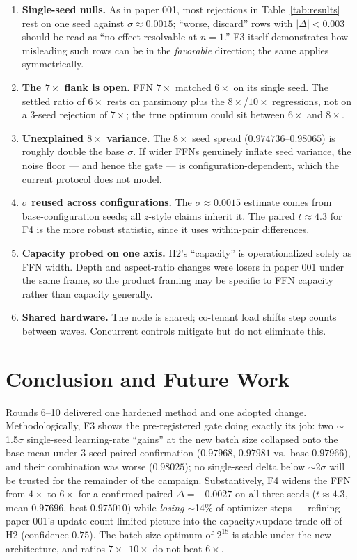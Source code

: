 \documentclass{article}
\begin{document}
\begin{enumerate}
    \item \textbf{Single-seed nulls.} As in paper 001, most rejections in Table~\ref{tab:results} rest on one seed against $\sigma \approx 0.0015$; ``worse, discard'' rows with $|\Delta| < 0.003$ should be read as ``no effect resolvable at $n{=}1$.'' F3 itself demonstrates how misleading such rows can be in the \emph{favorable} direction; the same applies symmetrically.
    \item \textbf{The $7\times$ flank is open.} FFN $7\times$ matched $6\times$ on its single seed. The settled ratio of $6\times$ rests on parsimony plus the $8\times$/$10\times$ regressions, not on a 3-seed rejection of $7\times$; the true optimum could sit between $6\times$ and $8\times$.
    \item \textbf{Unexplained $8\times$ variance.} The $8\times$ seed spread ($0.974736$--$0.98065$) is roughly double the base $\sigma$. If wider FFNs genuinely inflate seed variance, the noise floor --- and hence the gate --- is configuration-dependent, which the current protocol does not model.
    \item \textbf{$\sigma$ reused across configurations.} The $\sigma \approx 0.0015$ estimate comes from base-configuration seeds; all $z$-style claims inherit it. The paired $t \approx 4.3$ for F4 is the more robust statistic, since it uses within-pair differences.
    \item \textbf{Capacity probed on one axis.} H2's ``capacity'' is operationalized solely as FFN width. Depth and aspect-ratio changes were losers in paper 001 under the same frame, so the product framing may be specific to FFN capacity rather than capacity generally.
    \item \textbf{Shared hardware.} The node is shared; co-tenant load shifts step counts between waves. Concurrent controls mitigate but do not eliminate this.
\end{enumerate}

\section{Conclusion and Future Work}
\label{sec:conclusion}

Rounds 6--10 delivered one hardened method and one adopted change. Methodologically, F3 shows the pre-registered gate doing exactly its job: two $\sim$1.5$\sigma$ single-seed learning-rate ``gains'' at the new batch size collapsed onto the base mean under 3-seed paired confirmation ($0.97968$, $0.97981$ vs.\ base $0.97966$), and their combination was worse ($0.98025$); no single-seed delta below $\sim$2$\sigma$ will be trusted for the remainder of the campaign. Substantively, F4 widens the FFN from $4\times$ to $6\times$ for a confirmed paired $\Delta = -0.0027$ on all three seeds ($t \approx 4.3$, mean $0.97696$, best $0.975010$) while \emph{losing} $\sim$14\% of optimizer steps --- refining paper 001's update-count-limited picture into the capacity$\times$update trade-off of H2 (confidence $0.75$). The batch-size optimum of $2^{18}$ is stable under the new architecture, and ratios $7\times$--$10\times$ do not beat $6\times$.
\end{document}

